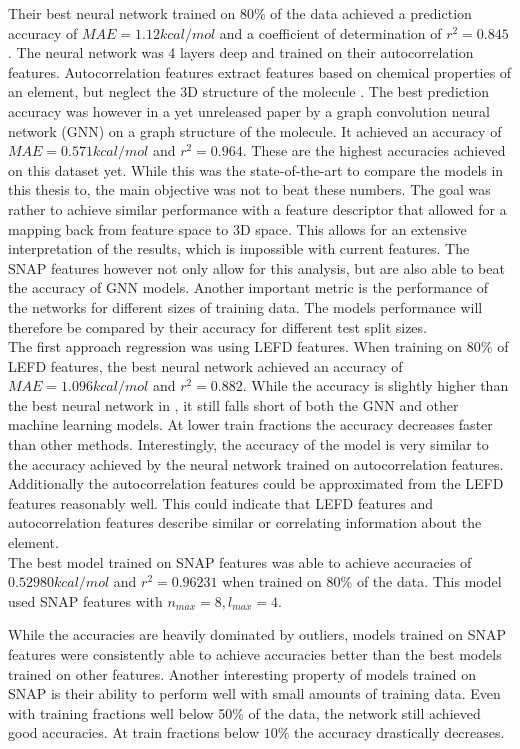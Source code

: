 Their best neural network trained on 80\% of the data achieved a prediction accuracy of $MAE = 1.12 kcal/mol$ and a 
coefficient of determination of $r^2 = 0.845$.
The neural network was 4 layers deep and trained on their autocorrelation features.
Autocorrelation features extract features based on chemical properties of an element, but neglect the 
3D structure of the molecule \cite{friederich_dos}.
The best prediction accuracy was however in a yet unreleased paper by  a graph convolution neural network (GNN) on 
a graph structure of the molecule.
It achieved an accuracy of $MAE = 0.571 kcal/mol$ and $r^2=0.964$.
These are the highest accuracies achieved on this dataset yet.
While this was the state-of-the-art  to compare the models in this thesis to, the main objective was not to beat these numbers.
The goal was rather to achieve similar performance with a feature descriptor that allowed for a mapping back from feature space to 3D space.
This allows for an extensive interpretation of the results, which is impossible with current features.
The SNAP features however not only allow for this analysis, but are also able to beat the accuracy of GNN models.
Another important metric is the performance of the networks for different sizes of training data.
The models performance will therefore be compared by their accuracy for different test split sizes.
\\
The first approach regression was using LEFD features.
When training on 80\% of LEFD features, the best neural network achieved an accuracy of $MAE = 1.096 kcal/mol$ and $r^2=0.882$.
While the accuracy is slightly higher than the best neural network in \cite{friederich_dos}, it still falls short 
of both the GNN and other machine learning models.
At lower train fractions the accuracy decreases faster than other methods.
Interestingly, the accuracy of the model is very similar to the accuracy achieved by the neural network trained on autocorrelation 
features.
Additionally the autocorrelation features could be approximated from the LEFD features reasonably well.
This could indicate that LEFD features and autocorrelation features describe
similar or correlating information about the element.
\\
The best model trained on SNAP features was able to achieve accuracies of $0.52980 kcal/mol$ and
$r^2 = 0.96231$ when trained on 80\% of the data.
This model used SNAP features with $n_{max}=8, l_{max}=4$.

While the accuracies are heavily dominated by outliers, models trained on SNAP features were consistently
able to achieve accuracies better than the best models trained on other features.
Another interesting property of models trained on SNAP is their ability to perform well with small amounts 
of training data.
Even with training fractions well below 50\% of the data, the network still achieved good accuracies.
At train fractions below $10\%$ the accuracy drastically decreases.

